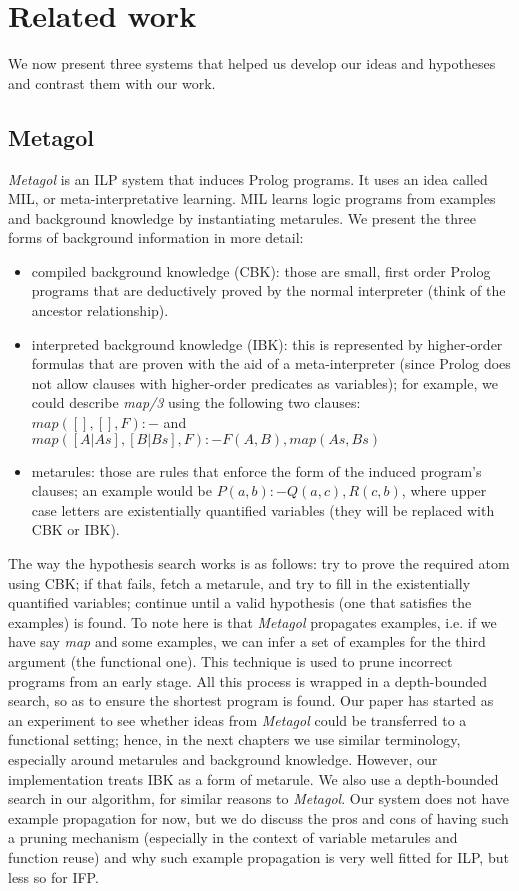 \section{Related work}
\par \indent We now present three systems that helped us develop our ideas and hypotheses and contrast them with our work.
\subsection{Metagol}
\indent \indent \textit{Metagol} \cite{metagol} is an ILP system that induces Prolog programs. It uses an idea called MIL, or meta-interpretative learning. MIL learns logic programs from examples and background knowledge by instantiating metarules. We present the three forms of background information in more detail:
\begin{itemize}
\item compiled background knowledge (CBK): those are small, first order Prolog programs that are deductively proved by the normal interpreter (think of the ancestor relationship).
\item interpreted background knowledge (IBK): this is represented by higher-order formulas that are proven with the aid of a meta-interpreter (since Prolog does not allow clauses with higher-order predicates as variables); for example, we could describe \textit{map/3} using the following two clauses:\\ $map([],[],F) :- $ and $map([A|As],[B|Bs],F) :- F(A,B), map(As,Bs)$
\item metarules: those are rules that enforce the form of the induced program's clauses; an example would be $P(a, b) :- Q(a, c), R(c, b)$, where upper case letters are existentially quantified variables (they will be replaced with CBK or IBK).
\end{itemize}
\par The way the hypothesis search works is as follows: try to prove the required atom using CBK; if that fails, fetch a metarule, and try to fill in the existentially quantified variables; continue until a valid hypothesis (one that satisfies the examples) is found. To note here is that \textit{Metagol} propagates examples, i.e. if we have say \textit{map} and some examples, we can infer a set of examples for the third argument (the functional one). This technique is used to prune incorrect programs from an early stage. All this process is wrapped in a depth-bounded search, so as to ensure the shortest program is found.
Our paper has started as an experiment to see whether ideas from \textit{Metagol} could be transferred to a functional setting; hence, in the next chapters we use similar terminology, especially around metarules and background knowledge. However, our implementation treats IBK as a form of metarule. We also use a depth-bounded search in our algorithm, for similar reasons to \textit{Metagol}. Our system does not have example propagation for now, but we do discuss the pros and cons of having such a pruning mechanism (especially in the context of variable metarules and function reuse) and why such example propagation is very well fitted for ILP, but less so for IFP.
